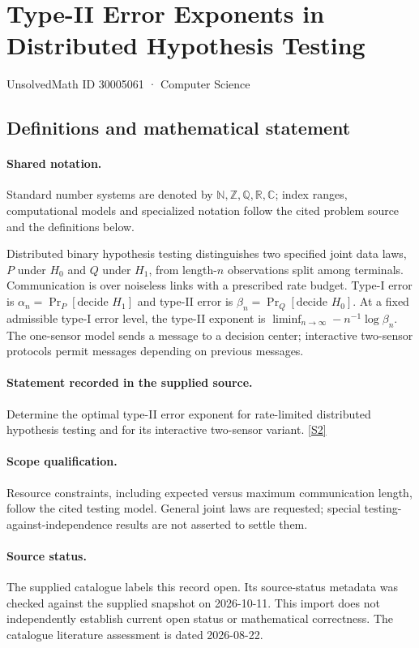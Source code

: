 \documentclass[11pt]{article}
\newcommand{\sref}[2]{\hyperlink{source:#1:#2}{[S#2]}}
\begin{document}
\setcounter{section}{30005060}
\section{Type-II Error Exponents in Distributed Hypothesis Testing}\label{30005061}
{\small\sffamily UnsolvedMath ID 30005061 · Computer Science}
\subsection{Definitions and mathematical statement}

\paragraph{Shared notation.}Standard number systems are denoted by $\mathbb N,\mathbb Z,\mathbb Q,\mathbb R,\mathbb C$; index ranges, computational models and specialized notation follow the cited problem source and the definitions below.


Distributed binary hypothesis testing distinguishes two specified joint data laws, $P$ under $H_0$ and $Q$ under $H_1$, from length-$n$ observations split among terminals. Communication is over noiseless links with a prescribed rate budget. Type-I error is $\alpha_n=\Pr_P[\text{decide }H_1]$ and type-II error is $\beta_n=\Pr_Q[\text{decide }H_0]$. At a fixed admissible type-I error level, the type-II exponent is $\liminf_{n\to\infty}-n^{-1}\log\beta_n$. The one-sensor model sends a message to a decision center; interactive two-sensor protocols permit messages depending on previous messages.
\paragraph{Statement recorded in the supplied source.}
Determine the optimal type-II error exponent for rate-limited distributed hypothesis testing and for its interactive two-sensor variant. \sref{30005061}{2}
\paragraph{Scope qualification.}
Resource constraints, including expected versus maximum communication length, follow the cited testing model. General joint laws are requested; special testing-against-independence results are not asserted to settle them.
\paragraph{Source status.}
The supplied catalogue labels this record open. Its source-status metadata was checked against the supplied snapshot on 2026-10-11. This import does not independently establish current open status or mathematical correctness. The catalogue literature assessment is dated 2026-08-22.
\end{document}

